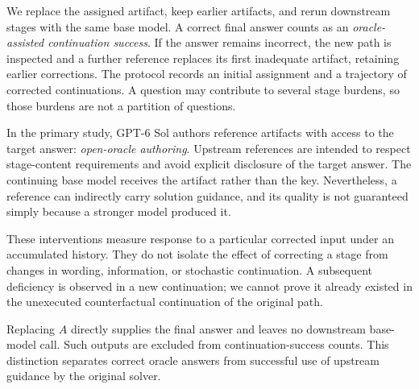 We replace the assigned artifact, keep earlier artifacts, and rerun downstream stages with the same base model. A correct final answer counts as an \emph{oracle-assisted continuation success}. If the answer remains incorrect, the new path is inspected and a further reference replaces its first inadequate artifact, retaining earlier corrections. The protocol records an initial assignment and a trajectory of corrected continuations. A question may contribute to several stage burdens, so those burdens are not a partition of questions.

In the primary study, GPT-6 Sol authors reference artifacts with access to the target answer: \emph{open-oracle authoring}. Upstream references are intended to respect stage-content requirements and avoid explicit disclosure of the target answer. The continuing base model receives the artifact rather than the key. Nevertheless, a reference can indirectly carry solution guidance, and its quality is not guaranteed simply because a stronger model produced it.

These interventions measure response to a particular corrected input under an accumulated history. They do not isolate the effect of correcting a stage from changes in wording, information, or stochastic continuation. A subsequent deficiency is observed in a new continuation; we cannot prove it already existed in the unexecuted counterfactual continuation of the original path.

Replacing $A$ directly supplies the final answer and leaves no downstream base-model call. Such outputs are excluded from continuation-success counts. This distinction separates correct oracle answers from successful use of upstream guidance by the original solver.

